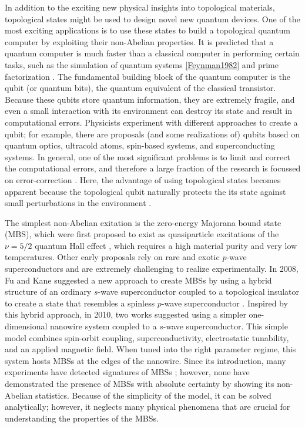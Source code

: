 In addition to the exciting new physical insights into topological materials, topological states might be used to design novel new quantum devices.
One of the most exciting applications is to use these states to build a topological quantum computer by exploiting their non-Abelian properties.
It is predicted that a quantum computer is much faster than a classical computer in performing certain tasks, such as the simulation of quantum systems \ref{Feynman1982} and prime factorization \cite{Shor1994}.
The fundamental building block of the quantum computer is the qubit (or quantum bits), the quantum equivalent of the classical transistor.
Because these qubits store quantum information, they are extremely fragile, and even a small interaction with its environment can destroy its state and result in computational errors.
Physicists experiment with different approaches to create a qubit; for example, there are proposals (and some realizations of) qubits based on quantum optics, ultracold atoms, spin-based systems, and superconducting systems.  %
In general, one of the most significant problems is to limit and correct the computational errors, and therefore a large fraction of the research is focussed on error-correction \cite{Lidar2013}.
Here, the advantage of using topological states becomes apparent because the topological qubit naturally protects the its state against small perturbations in the environment \cite{Nayak2008}.

The simplest non-Abelian exitation is the zero-energy Majorana bound state (MBS), which were first proposed to exist as quasiparticle excitations of the $\nu = 5/2$ quantum Hall effect \cite{Read2000,Moore1991}, which requires a high material purity and very low temperatures.
Other early proposals \cite{Gurarie2005,Sarma2006,Tewari2007} rely on rare and exotic $p$-wave superconductors and are extremely challenging to realize
experimentally.
In 2008, Fu and Kane suggested a new approach to create MBSs by using a hybrid structure of an ordinary $s$-wave superconductor coupled to a topological insulator to create a state that resembles a spinless $p$-wave superconductor \cite{Fu2008}.
Inspired by this hybrid approach, in 2010, two works \cite{Lutchyn2010,Oreg2010} suggested using a simpler one-dimensional nanowire system coupled to a $s$-wave superconductor.
This simple model combines spin-orbit coupling, superconductivity, electrostatic tunability, and an applied magnetic field.
When tuned into the right parameter regime, this system hosts MBSs at the edges of the nanowire.
Since its introduction, many experiments have detected signatures of MBSs \cite{Mourik2012,Das2012,Deng2012,Deng2016,Deng2016a,Chen2017}; however, none have demonstrated the presence of MBSs with absolute certainty by showing its non-Abelian statistics.
Because of the simplicity of the model, it can be solved analytically; however, it neglects many physical phenomena that are crucial for understanding the properties of the MBSs.

